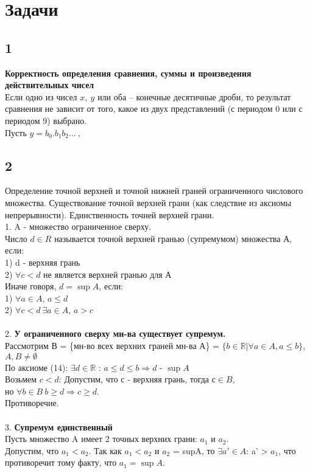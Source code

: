 	\section{Задачи}
		\subsection{1}
		\textbf{Корректность определения сравнения, суммы и произведения действительных чисел}
		\\
		Если одно из чисел $x,\ y$ или оба -- конечные десятичные дроби, то результат сравнения не зависит от того, какое из двух представлений (с периодом $0$ или с периодом $9$) выбрано.\\		
		Пусть $y = b_0.b_{1}b_{2}...\ , $
		
		\subsection{2}
		Определение точной верхней и точной нижней граней ограниченного числового множества. Существование точной верхней грани (как следствие из аксиомы непрерывности). Единственность точней верхней грани.
		\\
		1. A - множество ограниченное сверху. \\
		Число $d \in R $ называется точной верхней гранью (супремумом) множества $А$, если: \\
		1) d - верхняя грань \\
		2) $\forall c < d $ не является верхней гранью для $А$ \\
		Иначе говоря, $d = \sup A$, если:\\
		1) $\forall a \in A$, $ a \leqslant d $ \\
		2) $\forall c < d \ \exists a \in A$, $a > c $\\
		\\
		2. \textbf{У ограниченного сверху мн-ва существует супремум.}\\
		Рассмотрим $В$ = \{мн-во всех верхних граней мн-ва А\}
		= $\{b \in \mathbb{R} | \forall a \in A, a \leqslant b \}$, $A,B \neq \emptyset$ \\
		По аксиоме (14): $\exists d \in \mathbb{R}$ : $ a \leqslant d \leqslant b \Rightarrow d$ - $\sup A$ \\
		Возьмем $ c < d$: Допустим, что $с$ - верхняя грань, тогда $ с \in B$, \\
		но $\forall b \in B \ b \geqslant d \Rightarrow c \geqslant d $. \\
		Противоречие. \\
		\\
		3. \textbf{Супремум единственный}\\
		Пусть множество A имеет 2 точных верхних грани: $ a_1 $ и $ a_2$.\\
		Допустим, что $ a_1 < a_2$. Так как $a_1 < a_2$ и $a_2$ = supA, то $\exists a' \in A$: a' > $ a_1$, что противоречит тому факту, что $ a_1 = \sup A$.
		
